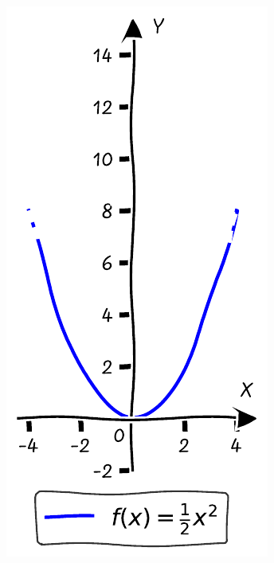 \documentclass{tufte-handout}
\begin{document}
\begin{figure}[h]
\begin{minipage}{0.19\textwidth}
  \end{minipage}\hfill
  \begin{minipage}{0.19\textwidth}
    \includegraphics[width=\linewidth]{./graphs/quadratic_func_shrink_2.pdf}

\end{minipage}
\end{figure}
\end{document}

